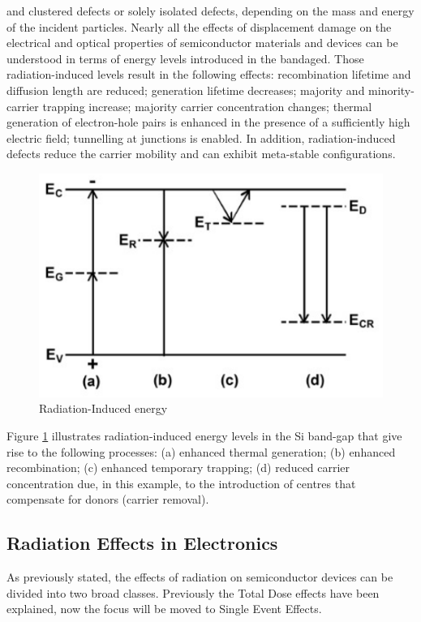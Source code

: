 \documentclass[./dissertation.tex]{subfiles}
\begin{document}
and clustered defects or solely isolated defects, depending on the mass and energy of
the incident particles. Nearly all the effects of displacement damage on the electrical and optical properties of semiconductor materials and devices can be understood
in terms of energy levels introduced in the bandaged. Those radiation-induced levels
result in the following effects: recombination lifetime and diffusion length are reduced; generation lifetime decreases; majority and minority-carrier trapping increase;
majority carrier concentration changes; thermal generation of electron-hole pairs is
enhanced in the presence of a sufficiently high electric field; tunnelling at junctions
is enabled. In addition, radiation-induced defects reduce the carrier mobility and can
exhibit meta-stable configurations\cite{bib10}.

\begin{figure}[h!]
\centering
  \includegraphics[scale = 0.50]{imgs/displ.png}
  \caption{Radiation-Induced energy}
  \label{fig:displ}
\end{figure}
Figure \ref{fig:displ} illustrates radiation-induced energy
levels in the Si band-gap that give rise to the following processes: (a) enhanced thermal generation; (b) enhanced recombination; (c) enhanced temporary trapping; (d)
reduced carrier concentration due, in this example, to the introduction of centres that
compensate for donors (carrier removal).
\subsection{Radiation Effects in Electronics}
As previously stated, the effects of radiation on semiconductor devices can be divided into two broad classes. Previously the Total Dose effects have been explained, now the focus will be moved to Single Event Effects.
\end{document}
